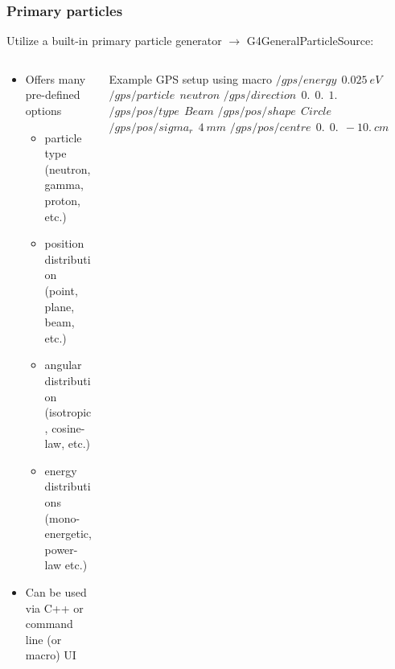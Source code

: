 \documentclass[xcolor=x11names, compress, handout]{beamer}
\renewcommand{\(}{\begin{columns}}
\renewcommand{\)}{\end{columns}}
\newcommand{\<}[1]{\begin{column}{#1}}
\renewcommand{\>}{\end{column}}
\begin{document}
\begin{frame}
\frametitle{Primary particles}
Utilize a built-in primary particle generator $\rightarrow$ G4GeneralParticleSource: \\
\begin{columns}
\begin{column}{0.55\textwidth}

\begin{itemize}
\item Offers many pre-defined options 
  \begin{itemize}
  \item particle type \\ (neutron, gamma, proton, etc.)
  \item position distribution \\(point, plane, beam, etc.)
  \item angular distribution \\(isotropic, cosine-law, etc.)
  \item energy distributions \\(mono-energetic, power-law etc.)
  \end{itemize}
\item Can be used via C++ or command line (or macro) UI
\end{itemize} 
\end{column}
\begin{column}{0.45\textwidth}
\begin{block}{Example GPS setup using macro}
$/gps/energy ~~0.025 ~eV$
$/gps/particle ~~neutron$
$/gps/direction ~~0. ~~0. ~~1.$
$/gps/pos/type ~~Beam$
$/gps/pos/shape ~~Circle$
$/gps/pos/sigma_r  ~~4 ~mm$ 
$/gps/pos/centre ~~0. ~~0. ~~-10. ~cm$
\end{block}
\end{column}
\end{columns}
\end{frame}
\end{document}
